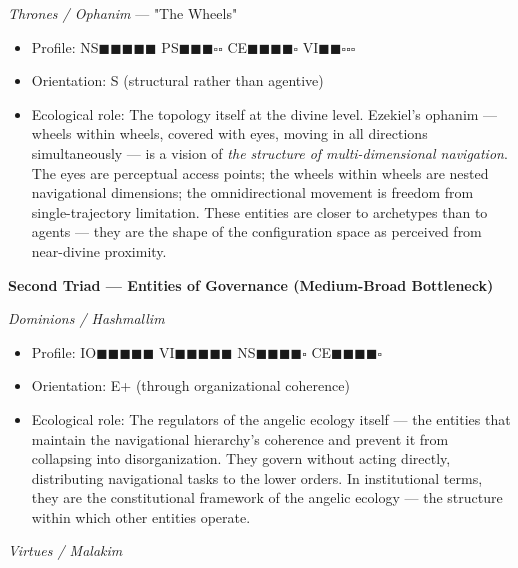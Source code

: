 \textit{Thrones / Ophanim} — "The Wheels"

\begin{itemize}[nosep,leftmargin=*]
  \item Profile: NS$\blacksquare$$\blacksquare$$\blacksquare$$\blacksquare$$\blacksquare$ PS$\blacksquare$$\blacksquare$$\blacksquare$$\square$$\square$ CE$\blacksquare$$\blacksquare$$\blacksquare$$\blacksquare$$\square$ VI$\blacksquare$$\blacksquare$$\square$$\square$$\square$
  \item Orientation: S (structural rather than agentive)
  \item Ecological role: The topology itself at the divine level. Ezekiel's ophanim — wheels within wheels, covered with eyes, moving in all directions simultaneously — is a vision of \textit{the structure of multi-dimensional navigation}. The eyes are perceptual access points; the wheels within wheels are nested navigational dimensions; the omnidirectional movement is freedom from single-trajectory limitation. These entities are closer to archetypes than to agents — they are the shape of the configuration space as perceived from near-divine proximity.
\end{itemize}


\textbf{Second Triad — Entities of Governance (Medium-Broad Bottleneck)}


\textit{Dominions / Hashmallim}

\begin{itemize}[nosep,leftmargin=*]
  \item Profile: IO$\blacksquare$$\blacksquare$$\blacksquare$$\blacksquare$$\blacksquare$ VI$\blacksquare$$\blacksquare$$\blacksquare$$\blacksquare$$\blacksquare$ NS$\blacksquare$$\blacksquare$$\blacksquare$$\blacksquare$$\square$ CE$\blacksquare$$\blacksquare$$\blacksquare$$\blacksquare$$\square$
  \item Orientation: E+ (through organizational coherence)
  \item Ecological role: The regulators of the angelic ecology itself — the entities that maintain the navigational hierarchy's coherence and prevent it from collapsing into disorganization. They govern without acting directly, distributing navigational tasks to the lower orders. In institutional terms, they are the constitutional framework of the angelic ecology — the structure within which other entities operate.
\end{itemize}


\textit{Virtues / Malakim}


